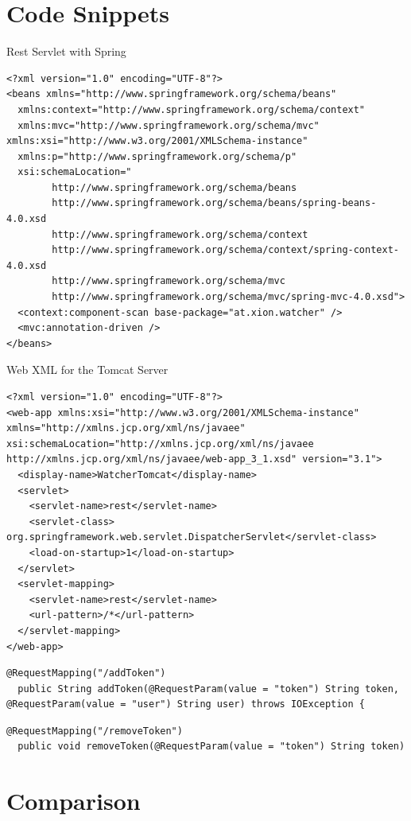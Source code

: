 \documentclass[12pt]{article}
\begin{document}
\section{Code Snippets}
Rest Servlet with Spring
\begin{lstlisting}
<?xml version="1.0" encoding="UTF-8"?>
<beans xmlns="http://www.springframework.org/schema/beans"
  xmlns:context="http://www.springframework.org/schema/context"
  xmlns:mvc="http://www.springframework.org/schema/mvc" xmlns:xsi="http://www.w3.org/2001/XMLSchema-instance"
  xmlns:p="http://www.springframework.org/schema/p"
  xsi:schemaLocation="
        http://www.springframework.org/schema/beans     
        http://www.springframework.org/schema/beans/spring-beans-4.0.xsd
        http://www.springframework.org/schema/context
        http://www.springframework.org/schema/context/spring-context-4.0.xsd
        http://www.springframework.org/schema/mvc
        http://www.springframework.org/schema/mvc/spring-mvc-4.0.xsd">
  <context:component-scan base-package="at.xion.watcher" />
  <mvc:annotation-driven />
</beans>
\end{lstlisting}
Web XML for the Tomcat Server
\begin{lstlisting}
<?xml version="1.0" encoding="UTF-8"?>
<web-app xmlns:xsi="http://www.w3.org/2001/XMLSchema-instance" xmlns="http://xmlns.jcp.org/xml/ns/javaee" xsi:schemaLocation="http://xmlns.jcp.org/xml/ns/javaee http://xmlns.jcp.org/xml/ns/javaee/web-app_3_1.xsd" version="3.1">
  <display-name>WatcherTomcat</display-name>
  <servlet>
    <servlet-name>rest</servlet-name>
    <servlet-class> org.springframework.web.servlet.DispatcherServlet</servlet-class>
    <load-on-startup>1</load-on-startup>
  </servlet>
  <servlet-mapping>
    <servlet-name>rest</servlet-name>
    <url-pattern>/*</url-pattern>
  </servlet-mapping>
</web-app>
\end{lstlisting}

\begin{lstlisting}
@RequestMapping("/addToken")
  public String addToken(@RequestParam(value = "token") String token, @RequestParam(value = "user") String user) throws IOException {
\end{lstlisting}
\begin{lstlisting}
@RequestMapping("/removeToken")
  public void removeToken(@RequestParam(value = "token") String token)
\end{lstlisting}
\section{Comparison}
\end{document}
